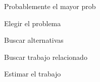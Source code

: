 Probablemente el mayor prob

Elegir el problema

Buscar alternativas

Buscar trabajo relacionado

Estimar el trabajo
